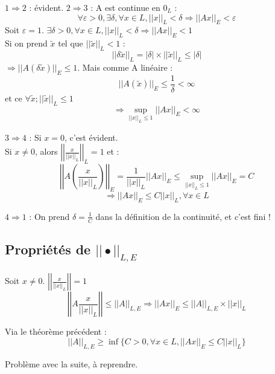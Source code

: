 \begin{dem}
$1\Rightarrow 2$ : évident.
$2\Rightarrow 3$ : A est continue en $0_L$ : \[\forall \varepsilon >0, \exists \delta, \forall x\in L, ||x||_L<\delta \Rightarrow ||Ax||_E <\varepsilon\]
Soit $\varepsilon=1$. $\exists \delta>0, \forall x\in L, ||x||_L<\delta \Rightarrow ||Ax||_E <1$ \\
Si on prend $\tilde{x}$ tel que $||\tilde{x}||_L<1$ :
\[||\delta \tilde{x}||_L = |\delta|\times||\tilde{x}||_L \leq |\delta|\]
$\Rightarrow ||A(\delta \tilde{x})||_E \leq 1$. Mais comme A linéaire : 
\[||A(\tilde{x})||_E \leq \frac{1}{\delta} < \infty\]
et ce $\forall \tilde{x}; ||\tilde{x}||_L \leq 1$
\[\Rightarrow \sup_{||x||_L\leq 1} ||Ax||_E<\infty\]

\bigskip
$3\Rightarrow 4$ : Si $x=0$, c'est évident.\\
Si $x\neq 0$, alors $\left|\left| \frac{x}{||x||_L}\right|\right|_L=1$ et : 
\[\left|\left| A\left(\frac{x}{||x||_L}\right) \right|\right|_E=\frac{1}{||x||_L} ||Ax||_E \leq \sup_{||x||_L \leq 1} ||Ax||_E = C\]
\[\Rightarrow ||Ax||_E \leq C||x||_L, \forall x\in L\]

\bigskip
$4\Rightarrow 1$ : On prend $\delta=\frac{1}{C}$ dans la définition de la continuité, et c'est fini !
\end{dem}


\subsection*{Propriétés de $||\bullet||_{L,E}$}

\begin{dem}
	Soit $x\neq 0$. $\left|\left|\frac{x}{||x||_L}\right|\right|=1$
	\[\left|\left| A \frac{x}{||x||_L} \right|\right| \leq ||A||_{L,E} \Rightarrow ||Ax||_E \leq ||A||_{L,E} \times ||x||_L\]
\end{dem}


\begin{dem}
	Via le théorème précédent : \[||A||_{L,E} \geq \inf\{C>0, \forall x\in L, ||Ax||_E \leq C||x||_L\}\]

	Problème avec la suite, à reprendre.
\end{dem}

